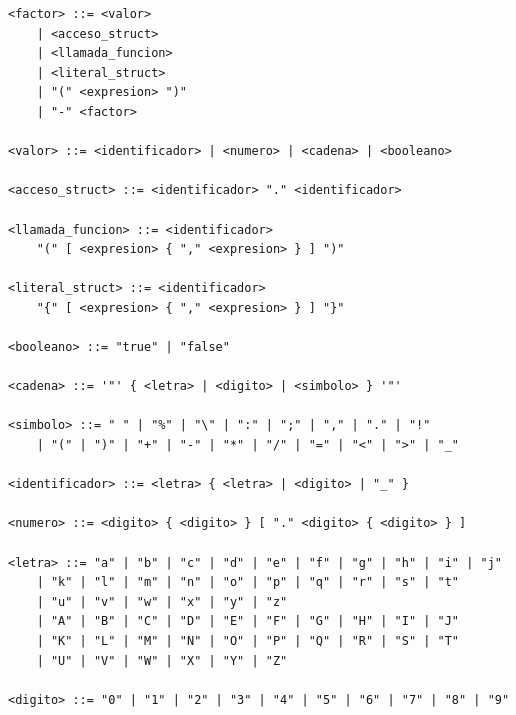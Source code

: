 \documentclass[11pt, a4paper]{article}
\begin{document}
\begin{lstlisting}[style=gramatica]
<factor> ::= <valor>
    | <acceso_struct>
    | <llamada_funcion>
    | <literal_struct>
    | "(" <expresion> ")"
    | "-" <factor>

<valor> ::= <identificador> | <numero> | <cadena> | <booleano>

<acceso_struct> ::= <identificador> "." <identificador>

<llamada_funcion> ::= <identificador>
    "(" [ <expresion> { "," <expresion> } ] ")"

<literal_struct> ::= <identificador>
    "{" [ <expresion> { "," <expresion> } ] "}"

<booleano> ::= "true" | "false"

<cadena> ::= '"' { <letra> | <digito> | <simbolo> } '"'

<simbolo> ::= " " | "%" | "\" | ":" | ";" | "," | "." | "!"
    | "(" | ")" | "+" | "-" | "*" | "/" | "=" | "<" | ">" | "_"

<identificador> ::= <letra> { <letra> | <digito> | "_" }

<numero> ::= <digito> { <digito> } [ "." <digito> { <digito> } ]

<letra> ::= "a" | "b" | "c" | "d" | "e" | "f" | "g" | "h" | "i" | "j"
    | "k" | "l" | "m" | "n" | "o" | "p" | "q" | "r" | "s" | "t"
    | "u" | "v" | "w" | "x" | "y" | "z"
    | "A" | "B" | "C" | "D" | "E" | "F" | "G" | "H" | "I" | "J"
    | "K" | "L" | "M" | "N" | "O" | "P" | "Q" | "R" | "S" | "T"
    | "U" | "V" | "W" | "X" | "Y" | "Z"

<digito> ::= "0" | "1" | "2" | "3" | "4" | "5" | "6" | "7" | "8" | "9"
\end{lstlisting}
\end{document}
